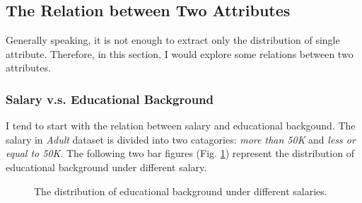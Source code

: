 \documentclass[12pt,a4paper]{article}
\theoremstyle{definition}
\begin{document}
\subsection{The Relation between Two Attributes}
\label{sec::relation}
Generally speaking, it is not enough to extract only the distribution of single attribute. Therefore, in this section, I would explore some relations between two attributes.

\subsubsection{Salary v.s. Educational Background}
\label{sec::salary_vs_edu}
I tend to start with the relation between salary and educational backgound. The salary in \textit{Adult} dataset is divided into two catagories: \textit{more than 50K} and \textit{less or equal to 50K}. The following two bar figures (Fig. \ref{fig::single_salary}) represent the distribution of educational background under different salary.

\begin{figure}[H]
	\centering
	\caption{The distribution of educational background under different salaries.}
	\label{fig::single_salary}
\end{figure}
\end{document}
